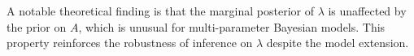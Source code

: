 A notable theoretical finding is that the marginal posterior of $\lambda$ is unaffected by the prior on $A$, which is unusual for multi-parameter Bayesian models. This property reinforces the robustness of inference on $\lambda$ despite the model extension.